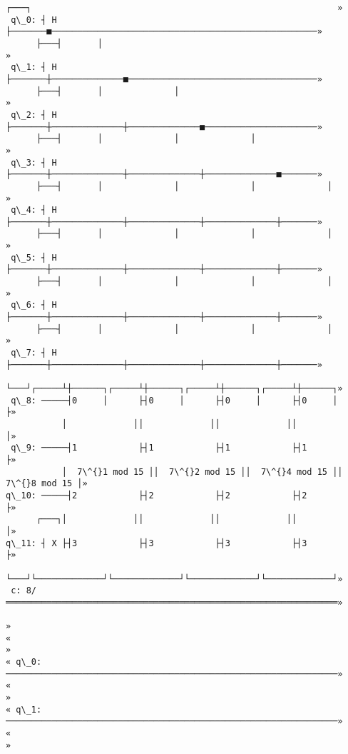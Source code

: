 \documentclass[11pt]{article}
\makeatletter
\newcommand{\boxspacing}{\kern\kvtcb@left@rule\kern\kvtcb@boxsep}
\newcommand{\prompt}[4]{
        \ttfamily\llap{{\color{#2}[#3]:\hspace{3pt}#4}}\vspace{-\baselineskip}
    }
\makeatother
\begin{document}
            \begin{tcolorbox}[breakable, size=fbox, boxrule=.5pt, pad at break*=1mm, opacityfill=0]
\prompt{Out}{outcolor}{8}{\boxspacing}
\begin{Verbatim}[commandchars=\\\{\}]
      ┌───┐                                                            »
 q\_0: ┤ H ├───────■────────────────────────────────────────────────────»
      ├───┤       │                                                    »
 q\_1: ┤ H ├───────┼──────────────■─────────────────────────────────────»
      ├───┤       │              │                                     »
 q\_2: ┤ H ├───────┼──────────────┼──────────────■──────────────────────»
      ├───┤       │              │              │                      »
 q\_3: ┤ H ├───────┼──────────────┼──────────────┼──────────────■───────»
      ├───┤       │              │              │              │       »
 q\_4: ┤ H ├───────┼──────────────┼──────────────┼──────────────┼───────»
      ├───┤       │              │              │              │       »
 q\_5: ┤ H ├───────┼──────────────┼──────────────┼──────────────┼───────»
      ├───┤       │              │              │              │       »
 q\_6: ┤ H ├───────┼──────────────┼──────────────┼──────────────┼───────»
      ├───┤       │              │              │              │       »
 q\_7: ┤ H ├───────┼──────────────┼──────────────┼──────────────┼───────»
      └───┘┌─────┴┼──────┐┌─────┴┼──────┐┌─────┴┼──────┐┌─────┴┼──────┐»
 q\_8: ─────┤0     │      ├┤0     │      ├┤0     │      ├┤0     │      ├»
           │             ││             ││             ││             │»
 q\_9: ─────┤1            ├┤1            ├┤1            ├┤1            ├»
           │  7\^{}1 mod 15 ││  7\^{}2 mod 15 ││  7\^{}4 mod 15 ││  7\^{}8 mod 15 │»
q\_10: ─────┤2            ├┤2            ├┤2            ├┤2            ├»
      ┌───┐│             ││             ││             ││             │»
q\_11: ┤ X ├┤3            ├┤3            ├┤3            ├┤3            ├»
      └───┘└─────────────┘└─────────────┘└─────────────┘└─────────────┘»
 c: 8/═════════════════════════════════════════════════════════════════»
                                                                       »
«                                                                       »
« q\_0: ─────────────────────────────────────────────────────────────────»
«                                                                       »
« q\_1: ─────────────────────────────────────────────────────────────────»
«                                                                       »

\end{Verbatim}
\end{tcolorbox}
\end{document}
